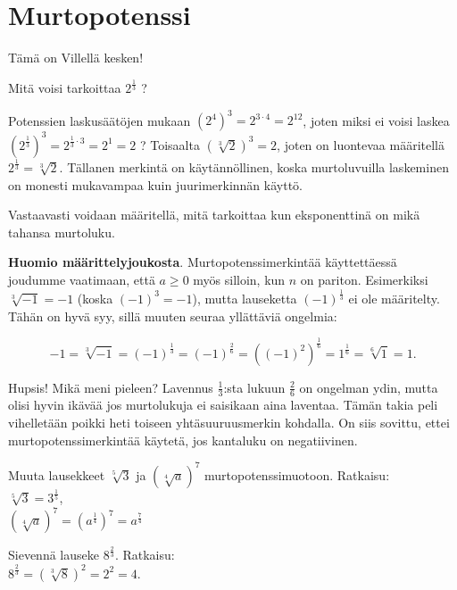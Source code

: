 \chapter{Murtopotenssi}

Tämä on Villellä kesken!

Mitä voisi tarkoittaa $2^\frac{1}{3}$ ?

Potenssien laskusäätöjen mukaan $(2^4)^3 = 2^{3\cdot 4} = 2^{12}$, joten miksi ei voisi laskea $\left( 2^{\frac{1}{3}}\right)^3 = 2^{\frac{1}{3}\cdot 3} = 2^1=2$ ? Toisaalta $(\sqrt[3]{2})^3=2$, joten on luontevaa määritellä $2^{\frac{1}{3}} = \sqrt[3]{2}$. Tällanen merkintä on käytännöllinen, koska murtoluvuilla laskeminen on monesti mukavampaa kuin juurimerkinnän käyttö.


Vastaavasti voidaan määritellä, mitä tarkoittaa kun eksponenttinä on mikä tahansa murtoluku.


{\bf Huomio määrittelyjoukosta}. Murtopotenssimerkintää käyttettäessä joudumme vaatimaan, että $a\geq 0$ myös silloin, kun $n$ on pariton. Esimerkiksi $\sqrt[3]{-1}=-1$ (koska $(-1)^3=-1$), mutta lauseketta $(-1)^\frac{1}{3}$ ei ole määritelty. Tähän on hyvä syy, sillä muuten seuraa yllättäviä ongelmia:

\[ -1 = \sqrt[3]{-1} = (-1)^\frac{1}{3} = (-1)^\frac{2}{6}
= ((-1)^2)^\frac{1}{6} = 1^\frac{1}{6} = \sqrt[6]{1} = 1. \]

Hupsis! Mikä meni pieleen? Lavennus $\frac{1}{3}$:sta lukuun $\frac{2}{6}$ on ongelman ydin, mutta olisi hyvin ikävää jos murtolukuja ei saisikaan aina laventaa. Tämän takia peli vihelletään poikki
heti toiseen yhtäsuuruusmerkin kohdalla. On siis sovittu, ettei
murtopotenssimerkintää käytetä, jos kantaluku on negatiivinen.

\begin{esimerkki}
Muuta lausekkeet $\sqrt[5]{3}$ ja $(\sqrt[4]{a})^7$ murtopotenssimuotoon. Ratkaisu: \\
$\sqrt[5]{3} = 3^\frac{1}{5}$, \\
$(\sqrt[4]{a})^7 = (a^\frac{1}{4})^7=a^\frac{7}{4}$
\end{esimerkki}

\begin{esimerkki}
Sievennä lauseke $8^\frac{2}{3}$. Ratkaisu: \\
 $8^\frac{2}{3} = (\sqrt[3]{8})^2 = 2^2 = 4.$
\end{esimerkki}